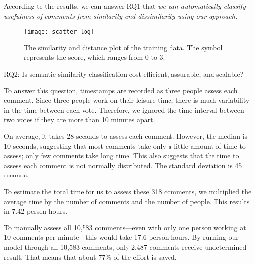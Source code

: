 According to the results, we can answer RQ1 that \emph{we can automatically classify usefulness of comments from similarity and dissimilarity using our approach.}



\begin{figure}[!t]
\centering
\texttt{[image: scatter\_log]}
\caption{The similarity and distance plot of the training data.
The symbol represents the score, which ranges from 0 to 3.}
\label{fig:scatter}
\end{figure}





\begin{ResearchQuestions}
\item[RQ2:] Is semantic similarity classification cost-efficient, assurable, and scalable?
\end{ResearchQuestions}

To answer this question, timestamps are recorded as three people assess each comment.
Since three people work on their leisure time, there is much variability in the time between each vote.
Therefore, we ignored the time interval between two votes if they are more than 10 minutes apart.

On average, it takes 28 seconds to assess each comment.
However, the median is 10 seconds, suggesting that most comments take only a little amount of time to assess; only few comments take long time.
This also suggests that the time to assess each comment is not normally distributed.
The standard deviation is 45 seconds.

To estimate the total time for us to assess these 318 comments,
we multiplied the average time by the number of comments and the number of people.
This results in 7.42 person hours.

To manually assess all 10,583 comments---even with only one person working at 10 comments per minute---this would take 17.6 person hours.
By running our model through all 10,583 comments, only 2,487 comments receive undetermined result.
That means that about 77\% of the effort is saved.

















